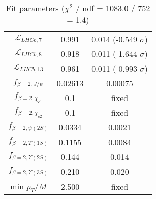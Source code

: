\begin{table}[h!]
\begin{tabular}{c|c|c}
$\mathcal L_{LHCb,7}$ & 0.991 & 0.014 (-0.549 $\sigma$) \\
$\mathcal L_{LHCb,8}$ & 0.918 & 0.011 (-1.644 $\sigma$) \\
$\mathcal L_{LHCb,13}$ & 0.961 & 0.011 (-0.993 $\sigma$) \\
$f_{\beta=2,J/\psi}$ & 0.02613 & 0.00075 \\
$f_{\beta=2,\chi_{c1}}$ & 0.1 & fixed \\
$f_{\beta=2,\chi_{c2}}$ & 0.1 & fixed \\
$f_{\beta=2,\psi(2S)}$ & 0.0334 & 0.0021 \\
$f_{\beta=2,\Upsilon(1S)}$ & 0.1155 & 0.0084 \\
$f_{\beta=2,\Upsilon(2S)}$ & 0.144 & 0.014 \\
$f_{\beta=2,\Upsilon(3S)}$ & 0.210 & 0.020 \\
min $p_T/M$ & 2.500 & fixed \\
\end{tabular}
\caption{Fit parameters ($\chi^2$ / ndf = 1083.0 / 752 = 1.4)}
\end{table}
